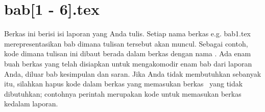 \section{bab[1 - 6].tex}
\label{sec:bab-tex}
Berkas ini berisi isi laporan yang Anda tulis.
Setiap nama berkas e.g. bab1.tex merepresentasikan bab dimana tulisan tersebut akan muncul.
Sebagai contoh, kode dimana tulisan ini dibaut berada dalam berkas dengan nama .
Ada enam buah berkas yang telah disiapkan untuk mengakomodir enam bab dari laporan Anda, diluar bab kesimpulan dan saran.
Jika Anda tidak membutuhkan sebanyak itu, silahkan hapus kode dalam berkas  yang memasukan berkas \latex~yang tidak dibutuhkan; contohnya perintah  merupakan kode untuk memasukan berkas  kedalam laporan.
